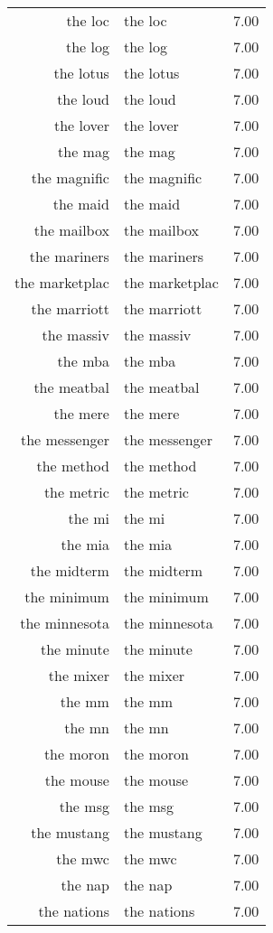 \begin{table}[ht]
\begin{tabular}{rlr}
  the loc & the loc & 7.00 \\ 
  the log & the log & 7.00 \\ 
  the lotus & the lotus & 7.00 \\ 
  the loud & the loud & 7.00 \\ 
  the lover & the lover & 7.00 \\ 
  the mag & the mag & 7.00 \\ 
  the magnific & the magnific & 7.00 \\ 
  the maid & the maid & 7.00 \\ 
  the mailbox & the mailbox & 7.00 \\ 
  the mariners & the mariners & 7.00 \\ 
  the marketplac & the marketplac & 7.00 \\ 
  the marriott & the marriott & 7.00 \\ 
  the massiv & the massiv & 7.00 \\ 
  the mba & the mba & 7.00 \\ 
  the meatbal & the meatbal & 7.00 \\ 
  the mere & the mere & 7.00 \\ 
  the messenger & the messenger & 7.00 \\ 
  the method & the method & 7.00 \\ 
  the metric & the metric & 7.00 \\ 
  the mi & the mi & 7.00 \\ 
  the mia & the mia & 7.00 \\ 
  the midterm & the midterm & 7.00 \\ 
  the minimum & the minimum & 7.00 \\ 
  the minnesota & the minnesota & 7.00 \\ 
  the minute & the minute & 7.00 \\ 
  the mixer & the mixer & 7.00 \\ 
  the mm & the mm & 7.00 \\ 
  the mn & the mn & 7.00 \\ 
  the moron & the moron & 7.00 \\ 
  the mouse & the mouse & 7.00 \\ 
  the msg & the msg & 7.00 \\ 
  the mustang & the mustang & 7.00 \\ 
  the mwc & the mwc & 7.00 \\ 
  the nap & the nap & 7.00 \\ 
  the nations & the nations & 7.00 \\ 

\end{tabular}
\end{table}
